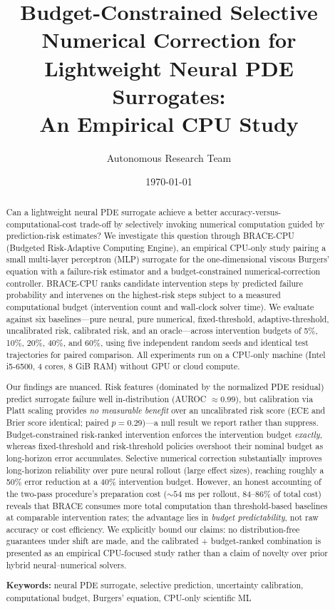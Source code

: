 \documentclass[11pt]{article}
\title{Budget-Constrained Selective Numerical Correction for Lightweight Neural PDE Surrogates:\\An Empirical CPU Study}
\author{Autonomous Research Team}
\date{\today}
\begin{document}
\maketitle

\begin{abstract}
Can a lightweight neural PDE surrogate achieve a better accuracy-versus-computational-cost trade-off by selectively invoking numerical computation guided by prediction-risk estimates? We investigate this question through BRACE-CPU (Budgeted Risk-Adaptive Computing Engine), an empirical CPU-only study pairing a small multi-layer perceptron (MLP) surrogate for the one-dimensional viscous Burgers' equation with a failure-risk estimator and a budget-constrained numerical-correction controller. BRACE-CPU ranks candidate intervention steps by predicted failure probability and intervenes on the highest-risk steps subject to a measured computational budget (intervention count and wall-clock solver time). We evaluate against six baselines---pure neural, pure numerical, fixed-threshold, adaptive-threshold, uncalibrated risk, calibrated risk, and an oracle---across intervention budgets of 5\%, 10\%, 20\%, 40\%, and 60\%, using five independent random seeds and identical test trajectories for paired comparison. All experiments run on a CPU-only machine (Intel i5-6500, 4 cores, 8 GiB RAM) without GPU or cloud compute.

Our findings are nuanced. Risk features (dominated by the normalized PDE residual) predict surrogate failure well in-distribution (AUROC $\approx 0.99$), but calibration via Platt scaling provides \emph{no measurable benefit} over an uncalibrated risk score (ECE and Brier score identical; paired $p=0.29$)---a null result we report rather than suppress. Budget-constrained risk-ranked intervention enforces the intervention budget \emph{exactly}, whereas fixed-threshold and risk-threshold policies overshoot their nominal budget as long-horizon error accumulates. Selective numerical correction substantially improves long-horizon reliability over pure neural rollout (large effect sizes), reaching roughly a 50\% error reduction at a 40\% intervention budget. However, an honest accounting of the two-pass procedure's preparation cost ($\sim 54$ ms per rollout, 84--86\% of total cost) reveals that BRACE consumes more total computation than threshold-based baselines at comparable intervention rates; the advantage lies in \emph{budget predictability}, not raw accuracy or cost efficiency. We explicitly bound our claims: no distribution-free guarantees under shift are made, and the calibrated + budget-ranked combination is presented as an empirical CPU-focused study rather than a claim of novelty over prior hybrid neural--numerical solvers.

\vspace{1em}
\textbf{Keywords:} neural PDE surrogate, selective prediction, uncertainty calibration, computational budget, Burgers' equation, CPU-only scientific ML
\end{abstract}
\end{document}
